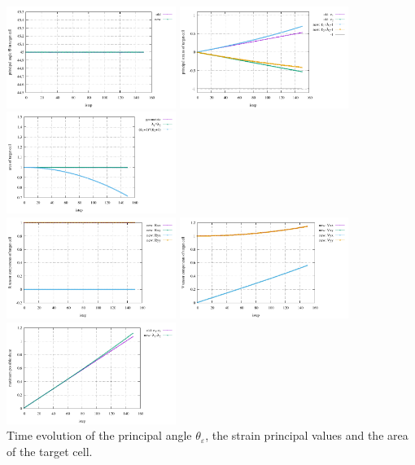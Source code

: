 \begin{center}
\includegraphics[width=5.5cm]{python_codes/fieldstone_89/results/pureshear/principal_angle.pdf}
\includegraphics[width=5.5cm]{python_codes/fieldstone_89/results/pureshear/principal_strains.pdf}
\includegraphics[width=5.5cm]{python_codes/fieldstone_89/results/pureshear/area.pdf}\\
\includegraphics[width=5.5cm]{python_codes/fieldstone_89/results/pureshear/R.pdf}
\includegraphics[width=5.5cm]{python_codes/fieldstone_89/results/pureshear/V.pdf}
\includegraphics[width=5.5cm]{python_codes/fieldstone_89/results/pureshear/maximum_shear.pdf}\\
{\captionfont Time evolution of the principal angle $\theta_\varepsilon$, 
the strain principal values and the area of the target cell.}
\end{center}

